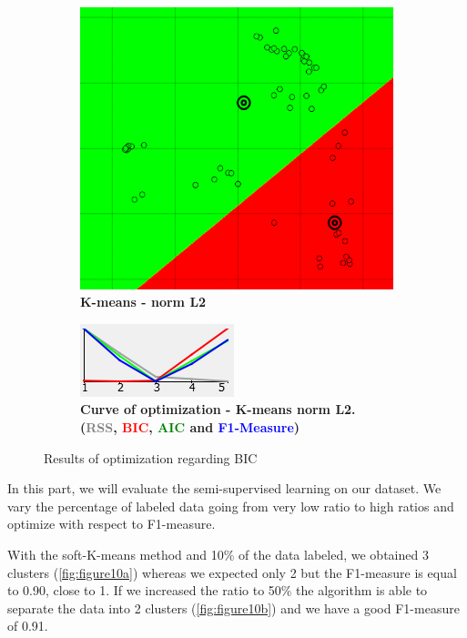 \begin{figure}[!h]
\begin{subfigure}[t]{0.25\textwidth}
    \includegraphics[height=0.08\textheight]{./clustering/opt_BIC_k_mean_L2_range5.png}
	\caption{\bf K-means - norm L2}
    \end{subfigure}
    \hspace{20mm}
    \begin{subfigure}[t]{0.50\textwidth}
    \centering
    \includegraphics[height=0.08\textheight]{./clustering/curve_opt_BIC_k_mean_L2_range5.png}
	\caption{\bf Curve of optimization - K-means norm L2. (\textcolor{gray}{RSS}, \textcolor{red}{BIC}, \textcolor{green}{AIC} and \textcolor{blue}{F1-Measure})}
    \end{subfigure}
\caption{Results of optimization regarding BIC}
\label{fig:figure9}
\end{figure}


In this part, we will evaluate the semi-supervised learning on our dataset. We vary the percentage of labeled data going from very low ratio to high ratios and optimize with respect to F1-measure.

With the soft-K-means method and 10\% of the data labeled, we obtained 3 clusters (\ref{fig:figure10a}) whereas we expected only 2 but the F1-measure is equal to 0.90, close to 1. If we increased the ratio to 50\% the algorithm is able to separate the data into 2 clusters (\ref{fig:figure10b}) and we have a good F1-measure of 0.91. 


